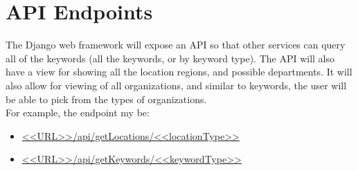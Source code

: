 \documentclass[11pt, hidelinks, letterpaper, obeyspaces]{article}
\begin{document}
\section{API Endpoints}
\label{sec:apiEndpoints}
The Django web framework will expose an API so that other services can query all
of the keywords (all the keywords, or by keyword type). The API will also have a
view for showing all the location regions, and possible departments. It will
also allow for viewing of all organizations, and similar to keywords, the user
will be able to pick from the types of organizations.\\
For example, the endpoint my be:\\
\begin{itemize}
   \item \url{<<URL>>/api/getLocations/<<locationType>>}
   \item \url{<<URL>>/api/getKeywords/<<keywordType>>}
\end{itemize}
\end{document}
